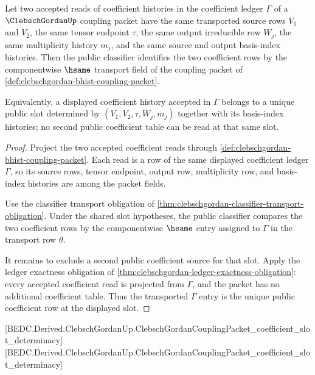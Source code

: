 \begin{theorem}
\label{thm:clebschgordan-coefficient-slot-determinacy}
Let two accepted reads of coefficient histories in the coefficient ledger
$\Gamma$ of a $\ClebschGordanUp$ coupling packet have the same transported
source rows $V_{1}$ and $V_{2}$, the same tensor endpoint $\tau$, the same
output irreducible row $W_{j}$, the same multiplicity history $m_{j}$, and
the same source and output basis-index histories. Then the public classifier
identifies the two coefficient rows by the componentwise $\hsame$ transport
field of the coupling packet of
\autoref{def:clebschgordan-bhist-coupling-packet}.

Equivalently, a displayed coefficient history accepted in $\Gamma$ belongs to
a unique public slot determined by
$(V_{1},V_{2},\tau,W_{j},m_{j})$ together with its basis-index histories; no
second public coefficient table can be read at that same slot.
\end{theorem}
\begin{proof}
Project the two accepted coefficient reads through
\autoref{def:clebschgordan-bhist-coupling-packet}. Each read is a row of the
same displayed coefficient ledger $\Gamma$, so its source rows, tensor
endpoint, output row, multiplicity row, and basis-index histories are among
the packet fields.

Use the classifier transport obligation of
\autoref{thm:clebschgordan-classifier-transport-obligation}. Under the shared
slot hypotheses, the public classifier compares the two coefficient rows by
the componentwise $\hsame$ entry assigned to $\Gamma$ in the transport row
$\theta$.

It remains to exclude a second public coefficient source for that slot. Apply
the ledger exactness obligation of
\autoref{thm:clebschgordan-ledger-exactness-obligation}: every accepted
coefficient read is projected from $\Gamma$, and the packet has no additional
coefficient table. Thus the transported $\Gamma$ entry is the unique public
coefficient row at the displayed slot.
\end{proof}

[BEDC.Derived.ClebschGordanUp.ClebschGordanCouplingPacket\_coefficient\_slot\_determinacy]
[BEDC.Derived.ClebschGordanUp.ClebschGordanCouplingPacket\_coefficient\_slot\_determinacy]

